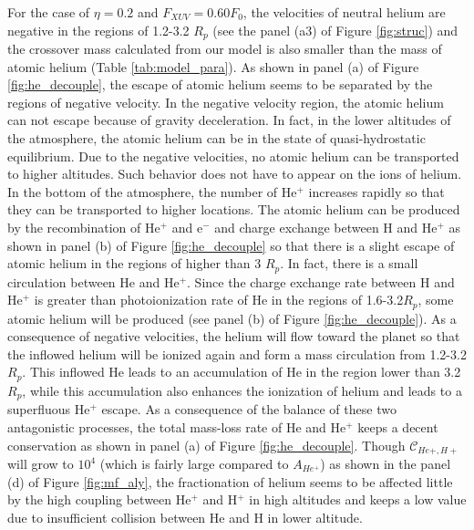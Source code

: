 \documentclass[journal, onecolumn]{aastex631}
\begin{document}
\begin{CJK*}{UTF8}{gbsn}
For the case of $\eta=0.2$ and $F_{XUV}=0.60F_{0}$, the velocities of neutral helium are negative in the regions of 1.2-3.2 $R_p$ (see the panel (a3) of Figure \ref{fig:struc}) and the crossover mass calculated from our model is also smaller than the mass of atomic helium (Table \ref{tab:model_para}). As shown in panel (a) of Figure \ref{fig:he_decouple}, the escape of atomic helium seems to be separated by the regions of negative velocity. In the negative velocity region, the atomic helium can not escape because of gravity deceleration. In fact, in the lower altitudes of the atmosphere, the atomic helium can be in the state of quasi-hydrostatic equilibrium. Due to the negative velocities, no atomic helium can be transported to higher altitudes. Such behavior does not have to appear on the ions of helium. In the bottom of the atmosphere, the number of He$^+$ increases rapidly so that they can be transported to higher locations. The atomic helium can be produced by the recombination of He$^+$ and e$^-$ and charge exchange between H and He$^+$ as shown in panel (b) of Figure \ref{fig:he_decouple} so that there is a slight escape of atomic helium in the regions of higher than 3 $R_{p}$. In fact, there is a small circulation between He and He$^+$. Since the charge exchange rate between H and He$^{+}$ is greater than photoionization rate of He in the regions of 1.6-3.2$R_{p}$, some atomic helium will be produced (see panel (b) of Figure \ref{fig:he_decouple}). As a consequence of negative velocities, the helium will flow toward the planet so that the inflowed helium will be ionized again and form a mass circulation from 1.2-3.2 $R_{p}$. This inflowed He leads to an accumulation of He in the region lower than 3.2$R_{p}$, while this accumulation also enhances the ionization of helium and leads to a superfluous He$^+$ escape. As a consequence of the balance of these two antagonistic processes, the total mass-loss rate of He and He$^+$ keeps a decent conservation as shown in panel (a) of Figure \ref{fig:he_decouple}. Though $\mathscr{C}_{He+, H+}$ will grow to $10^4$ (which is fairly large compared to $A_{He^+}$) as shown in the panel (d) of Figure \ref{fig:mf_aly}, the fractionation of helium seems to be affected little by the high coupling between He$^+$ and H$^+$ in high altitudes and keeps a low value due to insufficient collision between He and H in lower altitude.


\end{CJK*}
\end{document}
